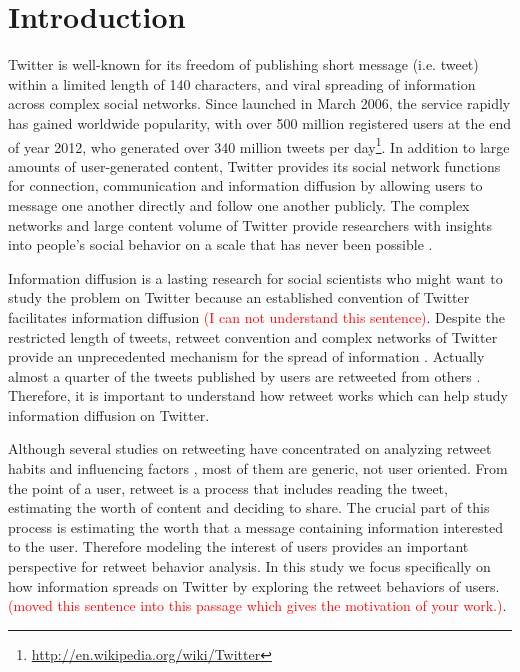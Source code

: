 \documentclass{acm_proc_article-sp}
\newcommand{\mo}[1]{\textcolor{red}{#1}}
\begin{document}
\section{Introduction}
\label{introduction}
Twitter is well-known for its freedom of publishing short message (i.e. tweet) within a limited length of 140 characters, and viral spreading of information across complex social networks.
Since launched in March 2006, the service rapidly has gained worldwide popularity, with over 500 million registered users at the end of year 2012, who generated over 340 million tweets per day\footnote{\url{http://en.wikipedia.org/wiki/Twitter}}.
In addition to large amounts of user-generated content, Twitter provides its social network functions for connection, communication and information diffusion by allowing users to message one another directly and follow one another publicly. 
The complex networks and large content volume of Twitter provide researchers with insights into people’s social behavior on a scale that has never been possible \cite{DBLP:conf/hicss/StieglitzD12}.

Information diffusion is a lasting research for social scientists who might want to study the problem on Twitter because an established convention of Twitter facilitates information diffusion \mo{(I can not understand this 	
sentence)}. 
Despite the restricted length of tweets, retweet convention and complex networks of Twitter provide an unprecedented mechanism for the spread of information \cite{Jenders:2013APV}. 
Actually almost a quarter of the tweets published by users are retweeted from others \cite{conf/cikm/YangGCTLZS10}. 
Therefore, it is important to understand how retweet works which can help study information diffusion on Twitter. 


Although several studies on retweeting have concentrated on analyzing retweet habits and influencing factors \cite{Boyd2010,Kwak:2010TSN,Suh2010}, most of them are generic, not user oriented.
From the point of a user, retweet is a process that includes reading the tweet, estimating the worth of content and deciding to share. The crucial part of this process is estimating the worth that a message containing information interested to the user.
Therefore modeling the interest of users provides an important perspective for retweet behavior analysis. 
In this study we focus specifically on how information spreads on Twitter by exploring the retweet behaviors of users.
\mo{(moved this sentence into this passage which gives the motivation of your work.)}. 
\end{document}
